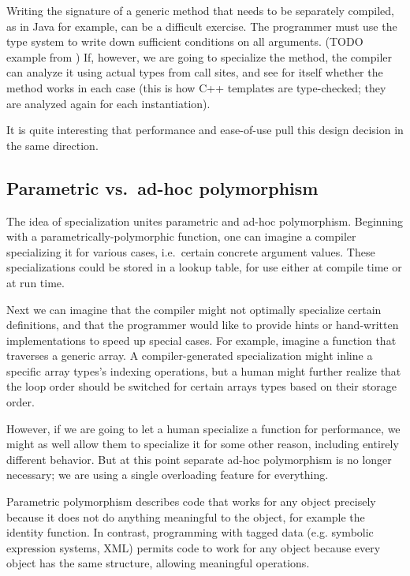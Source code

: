 Writing the signature of a generic method that needs to be separately compiled,
as in Java for example, can be a difficult exercise.
The programmer must use the type system to write down sufficient conditions on all
arguments.
(TODO example from \cite{Garcia:2003:CSL:949305.949317})
If, however, we are going to specialize the method, the compiler can analyze it
using actual types from call sites, and see for itself whether the method works
in each case (this is how C++ templates are type-checked; they are analyzed
again for each instantiation).

It is quite interesting that performance and ease-of-use pull this design
decision in the same direction.

\subsection{Parametric vs.\  ad-hoc polymorphism}


The idea of specialization unites parametric and ad-hoc polymorphism.
Beginning with a parametrically-polymorphic function, one can imagine
a compiler specializing it for various cases, i.e.\ certain concrete argument
values. These specializations could be stored in a lookup table, for use
either at compile time or at run time.

Next we can imagine that the compiler might not optimally specialize
certain definitions, and that the programmer would like to provide
hints or hand-written implementations to speed up special cases.
For example, imagine a function that traverses a generic array. A compiler-generated
specialization might inline a specific array types's indexing operations, but a human
might further realize that the loop order should be switched for certain
arrays types based on their storage order.

However, if we are going to let a human specialize a function for performance,
we might as well allow them to specialize it for some other reason, including
entirely different behavior. But at this point separate ad-hoc polymorphism
is no longer necessary; we are using a single overloading feature for
everything.


Parametric polymorphism describes code that works for any object precisely
because it does not do anything meaningful to the object, for example the
identity function. In contrast, programming with tagged data (e.g.
symbolic expression systems, XML) permits code to work for any object
because every object has the same structure, allowing meaningful
operations.

